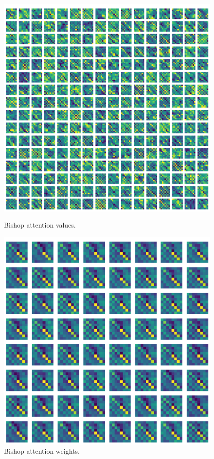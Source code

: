 \begin{figure}[H]
  \begin{minipage}{0.475\textwidth}
    \centering
    \includegraphics[width=\textwidth]{project/img/attention_maps/B_attention_4.png}
    \caption{Bishop attention values.}
    \label{atnB}
  \end{minipage}
  \hspace{0.05\textwidth}
  \begin{minipage}{0.475\textwidth}
    \centering
    \includegraphics[width=\textwidth]{project/img/attention_maps/B_weights_4.png}
    \caption{Bishop attention weights.}
    \label{atnB1}
  \end{minipage}
\end{figure}

